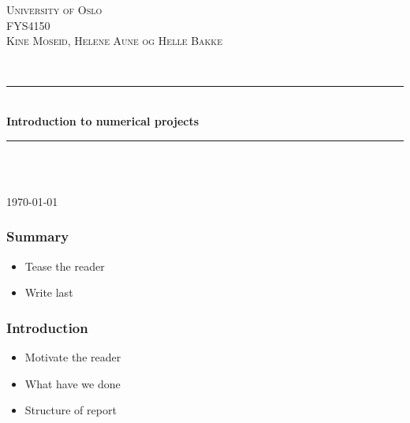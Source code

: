 \documentclass[12pt]{article}
\begin{document}
\begin{titlepage}

\newcommand{\HRule}{\rule{\linewidth}{0.5mm}} 
\center

\textsc{\LARGE University of Oslo}\\[1.5cm] 
\textsc{\Large FYS4150}\\[0.5cm] 
\textsc{\large Kine Moseid, Helene Aune og Helle Bakke}\\[0.5cm] 

\begin{minipage}{0.4\textwidth}
\end{minipage}\\[1cm]

\HRule \\[0.4cm]
{ \huge \bfseries Introduction to numerical projects}\\[0.4cm] 
\HRule \\[1.5cm]
 
\begin{minipage}{0.4\textwidth}
\end{minipage}\\[8cm]


{\large \today}\\[3cm] 
\vfill 

\end{titlepage}

\newpage
\tableofcontents

\newpage

\subsubsection*{Summary}

\begin{itemize}
\item Tease the reader
\item Write last
\end{itemize}

\subsubsection*{Introduction}

\begin{itemize}
\item Motivate the reader
\item What have we done
\item Structure of report
\end{itemize}
\end{document}
